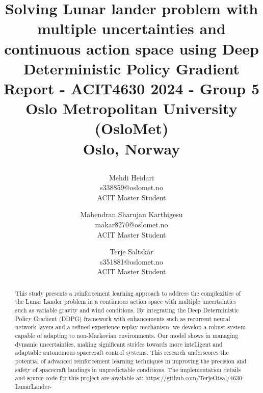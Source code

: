 \documentclass[conference]{IEEEtran}
\begin{document}
\title{Solving Lunar lander problem with multiple uncertainties and continuous action
space using Deep Deterministic Policy Gradient\\

{\footnotesize Report - ACIT4630 2024 - Group 5}\\
\vspace{-15}
{\footnotesize Oslo Metropolitan University (OsloMet)}\\
\vspace{-15}
{\footnotesize Oslo, Norway}
 
}
 
\author{
  \begin{tabular}[t]{@{}l@{}}
    \normalsize Mehdi Heidari \\
    \normalsize s338859@oslomet.no \\
    \small ACIT Master Student
  \end{tabular}
  \and
  \begin{tabular}[t]{@{}l@{}}
    \normalsize Mahendran Sharujan Karthigesu \\
    \normalsize makar8270@oslomet.no \\
    \small ACIT Master Student
  \end{tabular}
  \and
  \begin{tabular}[t]{@{}l@{}}
    \normalsize Terje Saltskår \\
    \normalsize s351881@oslomet.no \\
    \small ACIT Master Student
  \end{tabular}
}
\maketitle

\begin{abstract}
This study presents a reinforcement learning approach to address the complexities of the Lunar Lander problem in a continuous action space with multiple uncertainties such as variable gravity and wind conditions. By integrating the Deep Deterministic Policy Gradient (DDPG) framework with enhancements such as recurrent neural network layers and a refined experience replay mechanism, we develop a robust system capable of adapting to non-Markovian environments. Our model shows in managing dynamic uncertainties, making significant strides towards more intelligent and adaptable autonomous spacecraft control systems. This research underscores the potential of advanced reinforcement learning techniques in improving the precision and safety of spacecraft landings in unpredictable conditions. The implementation details and source code for this project are available at: https://github.com/TerjeOtsal/4630-LunarLander-
\end{abstract}
\end{document}
